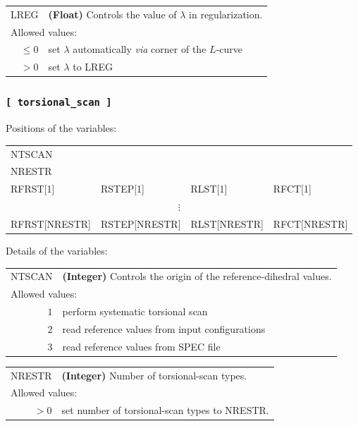 \documentclass[10pt,a4paper,openany]{memoir}
\numberwithin{equation}{section}
\begin{document}
{
\begin{tabular}{r@{ : }l}
\label{descr:lreg}
LREG&\textbf{(Float)} Controls the value of $\lambda$ in regularization.                                                             \\ 
\multicolumn{2}{l}{Allowed values:} \\ 
\(\leq0\)& set $\lambda$ automatically \textit{via} corner of the $L$-curve \\ 
    \(>0\)& set $\lambda$ to LREG \\
\end{tabular}
\vspace{1ex}
}

\subsubsection{\texttt{[~torsional\_scan~]}}
\label{sec:inp-torsional_scan}

Positions of the variables:
\begin{center}
  \begin{tabular}{llll}
    NTSCAN &      &      &      \\
    NRESTR &      &      &      \\
    RFRST[1] & RSTEP[1] & RLST[1] & RFCT[1] \\
    \multicolumn{4}{c}{$\vdots$} \\
    RFRST[NRESTR] & RSTEP[NRESTR] & RLST[NRESTR] & RFCT[NRESTR] \\
  \end{tabular}
\end{center}

\noindent Details of the variables:
\vspace{2ex}

{
\begin{tabular}{r@{ : }l}
\label{descr:rfrst}
     NTSCAN&\textbf{(Integer)} Controls the origin of the reference-dihedral values.                \\ 
\multicolumn{2}{l}{Allowed values:} \\ 
\(1\)& perform systematic torsional scan\\ 
\(2\)& read reference values from input configurations\\ 
\(3\)& read reference values from SPEC file\\ 
\end{tabular}
\vspace{1ex}
}

{
\begin{tabular}{r@{ : }l}
\label{descr:rfrst}
     NRESTR&\textbf{(Integer)} Number of torsional-scan types.                \\ 
\multicolumn{2}{l}{Allowed values:} \\ 
\(>0\)& set number of torsional-scan types to NRESTR.\\ 
\end{tabular}
\vspace{1ex}
}
\end{document}
